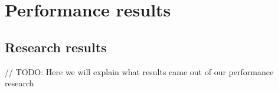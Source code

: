 
\chapter{Performance results} %

\label{Chapter4} 


\section{Research results}

// TODO: Here we will explain what results came out of our performance research

